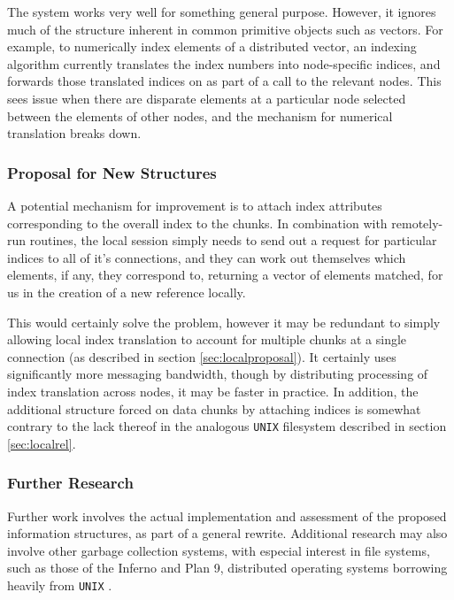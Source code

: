 The system works very well for something general purpose. However, it
ignores much of the structure inherent in common primitive \R objects
such as vectors. For example, to numerically index elements of a
distributed vector, an indexing algorithm currently translates the index
numbers into node-specific indices, and forwards those translated
indices on as part of a call to the relevant nodes. This sees issue when
there are disparate elements at a particular node selected between the
elements of other nodes, and the mechanism for numerical translation
breaks down.

\hypertarget{proposal-for-new-structures}{%
\subsubsection{Proposal for New
Structures}\label{proposal-for-new-structures}}

A potential mechanism for improvement is to attach index attributes
corresponding to the overall index to the chunks. In combination with
remotely-run routines, the local session simply needs to send out a
request for particular indices to all of it's connections, and they can
work out themselves which elements, if any, they correspond to,
returning a vector of elements matched, for us in the creation of a new
reference locally.

This would certainly solve the problem, however it may be redundant to
simply allowing local index translation to account for multiple chunks
at a single connection (as described in section
\cref{sec:localproposal}). It certainly uses significantly more
messaging bandwidth, though by distributing processing of index
translation across nodes, it may be faster in practice. In addition, the
additional structure forced on data chunks by attaching indices is
somewhat contrary to the lack thereof in the analogous \texttt{UNIX}
filesystem described in section \cref{sec:localrel}.

\hypertarget{further-research}{%
\subsubsection{Further Research}\label{further-research}}

Further work involves the actual implementation and assessment of the
proposed information structures, as part of a general rewrite.
Additional research may also involve other garbage collection systems,
with especial interest in file systems, such as those of the Inferno and
Plan 9, distributed operating systems borrowing heavily from
\texttt{UNIX} \cite{dorward1997inferno}\cite{pike1995plan}.

